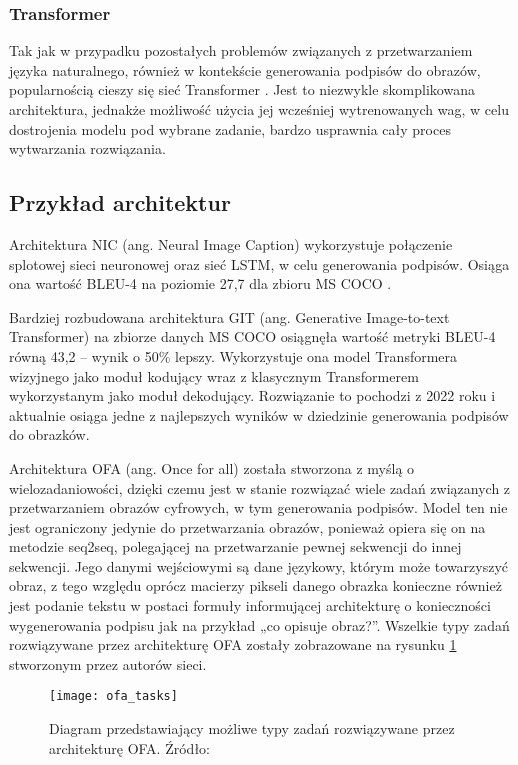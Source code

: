 \subsubsection{Transformer}
Tak jak w przypadku pozostałych problemów związanych z przetwarzaniem języka naturalnego, również w kontekście generowania podpisów do obrazów, popularnością cieszy się sieć Transformer \cite{transformer}. Jest to niezwykle skomplikowana architektura, jednakże możliwość użycia jej wcześniej wytrenowanych wag, w celu dostrojenia modelu pod wybrane zadanie, bardzo usprawnia cały proces wytwarzania rozwiązania.
\subsection{Przykład architektur}
Architektura NIC (ang. Neural Image Caption) \cite{nic} wykorzystuje połączenie splotowej sieci neuronowej oraz sieć LSTM, w celu generowania podpisów. Osiąga ona wartość BLEU-4 na poziomie 27,7 dla zbioru MS COCO \cite{mscoco}.

Bardziej rozbudowana architektura GIT (ang. Generative Image-to-text Transformer) \cite{wang2022git} na zbiorze danych MS COCO osiągnęła wartość metryki BLEU-4 równą 43,2 -- wynik o 50\% lepszy. Wykorzystuje ona model Transformera wizyjnego jako moduł kodujący wraz z klasycznym Transformerem wykorzystanym jako moduł dekodujący. Rozwiązanie to pochodzi z 2022 roku i aktualnie osiąga jedne z najlepszych wyników w dziedzinie generowania podpisów do obrazków.

Architektura OFA (ang. Once for all) \cite{wang2022ofa} została stworzona z myślą o wielozadaniowości, dzięki czemu jest w stanie rozwiązać wiele zadań związanych z przetwarzaniem obrazów cyfrowych, w tym generowania podpisów. Model ten nie jest ograniczony jedynie do przetwarzania obrazów, ponieważ opiera się on na metodzie seq2seq, polegającej na przetwarzanie pewnej sekwencji do innej sekwencji. Jego danymi wejściowymi są dane językowy, którym może towarzyszyć obraz, z tego względu oprócz macierzy pikseli danego obrazka konieczne również jest podanie tekstu w postaci formuły informującej architekturę o konieczności wygenerowania podpisu jak na przykład „co opisuje obraz?”. Wszelkie typy zadań rozwiązywane przez architekturę OFA zostały zobrazowane na rysunku \ref{fig:ofa-tasks} stworzonym przez autorów sieci.
\begin{figure}[H]
  \centering
  \texttt{[image: ofa\_tasks]}
  \caption{Diagram przedstawiający możliwe typy zadań rozwiązywane przez architekturę OFA. Źródło: \cite{wang2022ofa}}
  \label{fig:ofa-tasks}
\end{figure}
